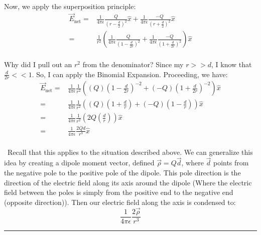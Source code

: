 \documentclass{article}
\begin{document}
\\
Now, we apply the superposition principle:\\
\begin{align}
\vec{E}_{\text{net}} =& \frac{1}{4\pi\epsilon}\frac{Q}{(r-\frac{d}{2})^2}\hat{x} + \frac{1}{4\pi\epsilon}\frac{-Q}{(r+\frac{d}{2})^2}\hat{x}\\
=& \frac{1}{r^2}(\frac{1}{4\pi\epsilon}\frac{Q}{(1-\frac{d}{2r})^2} + \frac{1}{4\pi\epsilon}\frac{-Q}{(1+\frac{d}{2r})^2})\hat{x}
\end{align}
\\
Why did I pull out an $r^2$ from the denominator? Since my $r >> d$, I know that $\frac{d}{2r} << 1$. So, I can apply the Binomial Expansion. Proceeding, we have:
\begin{align}
\vec{E}_{\text{net}} =& \frac{1}{4\pi\epsilon}\frac{1}{r^2}((Q)(1-\frac{d}{2r})^{-2} + (-Q)(1+\frac{d}{2r})^{-2})\hat{x}\\
=& \frac{1}{4\pi\epsilon}\frac{1}{r^2}((Q)(1+\frac{d}{r}) + (-Q)(1-\frac{d}{r}))\hat{x}\\
=& \frac{1}{4\pi\epsilon}\frac{1}{r^2}(2Q(\frac{d}{r}))\hat{x}\\
=& \frac{1}{4\pi\epsilon}\frac{2Qd}{r^3}\hat{x}
\end{align}\\ \
Recall that this applies to the situation described above. We can generalize this idea by creating a dipole moment vector, defined $\vec{\rho} = Q\vec{d}$, where $\vec{d}$ points from the negative pole to the positive pole of the dipole. This pole direction is the direction of the electric field along its axis around the dipole (Where the electric field between the poles is simply from the positive end to the negative end (opposite direction)). Then our electric field along the axis is condensed to: $$\frac{1}{4\pi\epsilon}\frac{2\vec{\rho}}{r^3}$$
\noindent\rule{\textwidth}{1pt}
\\
\\
\end{document}
